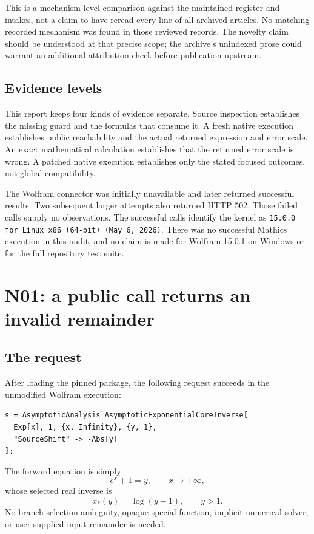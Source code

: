 \documentclass[11pt,letterpaper]{article}
\newcommand{\code}[1]{\texttt{#1}}
\begin{document}
This is a mechanism-level comparison against the maintained register and intakes, not a claim to have reread every line of all archived articles. No matching recorded mechanism was found in those reviewed records. The novelty claim should be understood at that precise scope; the archive's unindexed prose could warrant an additional attribution check before publication upstream.

\subsection{Evidence levels}
This report keeps four kinds of evidence separate. Source inspection establishes the missing guard and the formulas that consume it. A fresh native execution establishes public reachability and the actual returned expression and error scale. An exact mathematical calculation establishes that the returned error scale is wrong. A patched native execution establishes only the stated focused outcomes, not global compatibility.

The Wolfram connector was initially unavailable and later returned successful results. Two subsequent larger attempts also returned HTTP 502. Those failed calls supply no observations. The successful calls identify the kernel as \code{15.0.0 for Linux x86 (64-bit) (May 6, 2026)}. There was no successful Mathics execution in this audit, and no claim is made for Wolfram 15.0.1 on Windows or for the full repository test suite.

\section{N01: a public call returns an invalid remainder}
\subsection{The request}
After loading the pinned package, the following request succeeds in the unmodified Wolfram execution:
\begin{lstlisting}
s = AsymptoticAnalysis`AsymptoticExponentialCoreInverse[
  Exp[x], 1, {x, Infinity}, {y, 1},
  "SourceShift" -> -Abs[y]
];
\end{lstlisting}
The forward equation is simply
\begin{equation}\label{eq:forward}
 e^x+1=y,\qquad x\longrightarrow+\infty,
\end{equation}
whose selected real inverse is
\begin{equation}\label{eq:inverse}
 x_*(y)=\log(y-1),\qquad y>1.
\end{equation}
No branch selection ambiguity, opaque special function, implicit numerical solver, or user-supplied input remainder is needed.
\end{document}

